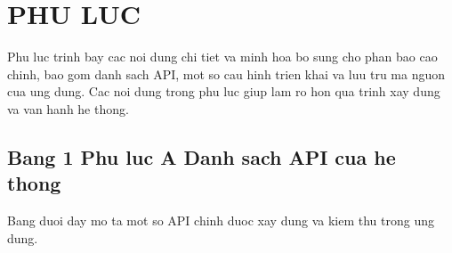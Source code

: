 
\chapter*{PHU LUC}

Phu luc trinh bay cac noi dung chi tiet va minh hoa bo sung cho phan bao cao chinh, bao gom danh sach API, mot so cau hinh trien khai va luu tru ma nguon cua ung dung. Cac noi dung trong phu luc giup lam ro hon qua trinh xay dung va van hanh he thong.

\section*{Bang 1 Phu luc A Danh sach API cua he thong}

Bang duoi day mo ta mot so API chinh duoc xay dung va kiem thu trong ung dung.

